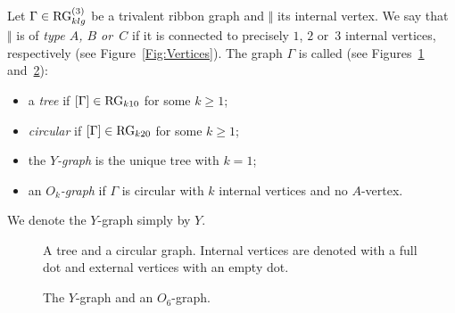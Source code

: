 \documentclass[\MainFolder/Text.tex]{subfiles}
\begin{document}
\begin{Definition}\label{Def:Graphs}
Let $\Gamma \in \mathrm{RG}^{(3)}_{klg}$ be a trivalent ribbon graph and $\Vert$ its internal vertex. We say that~$\Vert$ is of \emph{type $A$, $B$ or~$C$} if it is connected to precisely $1$, $2$ or~$3$ internal vertices, respectively (see Figure~\ref{Fig:Vertices}). The graph $\Gamma$ is called (see Figures~\ref{Fig:Types} and~\ref{Fig:YOk}):
\begin{itemize}
\item a \emph{tree} if $[\Gamma] \in \mathrm{RG}_{k10}$ for some $k\ge 1$;
\item \emph{circular} if $[\Gamma]\in \mathrm{RG}_{k20}$ for some $k\ge 1$;
\item the \emph{$Y$-graph} is the unique tree with $k=1$;
\item an \emph{$O_k$-graph} if $\Gamma$ is circular with $k$ internal vertices and no $A$-vertex.
\end{itemize}
We denote the $Y$-graph simply by $Y$.
\end{Definition}

{ \begingroup
\begin{figure}[t]
\centering
\begin{subfigure}{0.4\textwidth}
\centering

\end{subfigure}
\begin{subfigure}{0.4\textwidth}
\centering

\end{subfigure}
\caption[A tree and a circular graph.]{A tree and a circular graph. Internal vertices are denoted with a full dot and external vertices with an empty dot.}\label{Fig:Types}
\end{figure}
\endgroup }
%
{ \begingroup
\begin{figure}[t]
\centering
\begin{subfigure}{0.4\textwidth}
\centering

\end{subfigure}
\begin{subfigure}{0.4\textwidth}
\centering

\end{subfigure}
\caption{The $Y$-graph and an $O_6$-graph.}\label{Fig:YOk}
\end{figure}
\endgroup }
\end{document}
